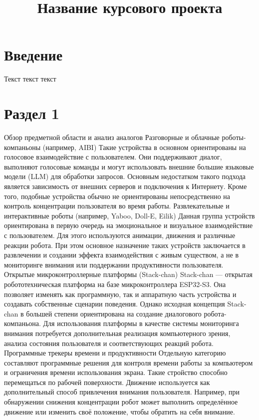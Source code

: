 \documentclass[utf8, russian]{eskdtext}
\title{{\small Название курсового проекта}}
\let\stdsection\section
\renewcommand \section{\newpage\stdsection}
\begin{document}
\maketitle
\tableofcontents
\section*{Введение}
Текст текст текст

\newpage

\section{Раздел 1}
Обзор предметной области и анализ аналогов
Разговорные и облачные роботы-компаньоны (например, AIBI)
Такие устройства в основном ориентированы на голосовое взаимодействие с пользователем. Они поддерживают диалог, выполняют голосовые команды и могут использовать внешние большие языковые модели (LLM) для обработки запросов.
Основным недостатком такого подхода является зависимость от внешних серверов и подключения к Интернету. Кроме того, подобные устройства обычно не ориентированы непосредственно на контроль концентрации пользователя во время работы.
Развлекательные и интерактивные роботы (например, Yaboo, Doll-E, Eilik)
Данная группа устройств ориентирована в первую очередь на эмоциональное и визуальное взаимодействие с пользователем. Для этого используются анимации, движения и различные реакции робота.
При этом основное назначение таких устройств заключается в развлечении и создании эффекта взаимодействия с живым существом, а не в мониторинге внимания или поддержании продуктивности пользователя.
Открытые микроконтроллерные платформы (Stack-chan)
Stack-chan — открытая робототехническая платформа на базе микроконтроллера ESP32-S3. Она позволяет изменять как программную, так и аппаратную часть устройства и создавать собственные сценарии поведения.
Однако исходная концепция Stack-chan в большей степени ориентирована на создание диалогового робота-компаньона. Для использования платформы в качестве системы мониторинга внимания потребуется дополнительная реализация компьютерного зрения, анализа состояния пользователя и соответствующих реакций робота.
Программные трекеры времени и продуктивности
Отдельную категорию составляют программные решения для контроля времени работы за компьютером и ограничения времени использования экрана. Такие ­стройство способно перемещаться по рабочей поверхности.
Движение используется как дополнительный способ привлечения внимания пользователя. Например, при обнаружении снижения концентрации робот может выполнить определённое движение или изменить своё положение, чтобы обратить на себя внимание.
\end{document}
